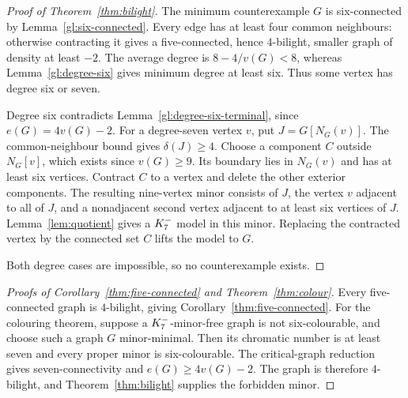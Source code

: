 \begin{proof}[Proof of Theorem~\ref{thm:bilight}]
The minimum counterexample $G$ is six-connected by
Lemma~\ref{gl:six-connected}. Every edge has at least four common
neighbours: otherwise contracting it gives a five-connected, hence
$4$-bilight, smaller graph of density at least $-2$. The average
degree is $8-4/v(G)<8$, whereas Lemma~\ref{gl:degree-six} gives
minimum degree at least six. Thus some vertex has degree six or seven.

Degree six contradicts Lemma~\ref{gl:degree-six-terminal}, since
$e(G)=4v(G)-2$. For a degree-seven vertex $v$, put $J=G[N_G(v)]$.
The common-neighbour bound gives $\delta(J)\geq4$. Choose a
component $C$ outside $N_G[v]$, which exists since $v(G)\geq9$.
Its boundary lies in $N_G(v)$ and has at least six vertices.
Contract $C$ to a vertex and delete the other exterior components.
The resulting nine-vertex minor consists of $J$, the vertex $v$
adjacent to all of $J$, and a nonadjacent second vertex adjacent to
at least six vertices of $J$. Lemma~\ref{lem:quotient} gives a
$K_7^{-}$ model in this minor. Replacing the contracted vertex by
the connected set $C$ lifts the model to $G$.

Both degree cases are impossible, so no counterexample exists.
\end{proof}

\begin{proof}[Proofs of Corollary~\ref{thm:five-connected} and
Theorem~\ref{thm:colour}]
Every five-connected graph is $4$-bilight, giving
Corollary~\ref{thm:five-connected}. For the colouring theorem, suppose
a $K_7^{-}$-minor-free graph is not six-colourable, and choose such
a graph $G$ minor-minimal. Then its chromatic number is at least
seven and every proper minor is six-colourable.
The critical-graph reduction~\cite[Theorem~1.6]{DNR2026} gives
seven-connectivity and $e(G)\geq4v(G)-2$. The graph is therefore
$4$-bilight, and Theorem~\ref{thm:bilight} supplies the forbidden
minor.
\end{proof}
